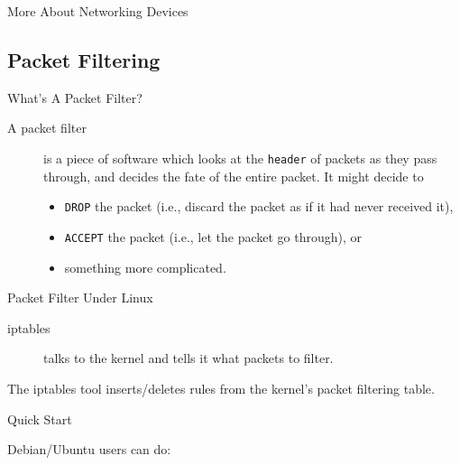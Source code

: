 \begin{frame}{More About Networking Devices}
  \begin{refsection}
    \nocite{wiki:router, wiki:routingtable, wiki:switch, wiki:lanswitching,}
    \printbibliography[heading=none]
  \end{refsection}
\end{frame}

\subsection{Packet Filtering}

\begin{frame}{What's A Packet Filter?}
  \begin{description}
  \item[A packet filter] is a piece of software which looks at the
    \texttt{header} of packets as they pass through, and decides the
    fate of the entire packet. It might decide to
    \begin{itemize}
    \item \texttt{DROP} the packet (i.e., discard the packet as if it
      had never received it),
    \item \texttt{ACCEPT} the packet (i.e., let the packet go
      through), or
    \item something more complicated.
    \end{itemize}
  \end{description}
\end{frame}

\begin{frame}{Packet Filter Under Linux}
  \begin{description}
  \item[iptables] talks to the kernel and tells it what packets to filter.
  \end{description}
  The iptables tool inserts/deletes rules from the kernel's packet filtering table.
\end{frame}

\begin{frame}{Quick Start}
  \begin{block}{Debian/Ubuntu users can do:}
    \begin{center}
    \end{center}
  \end{block}
\end{frame}

